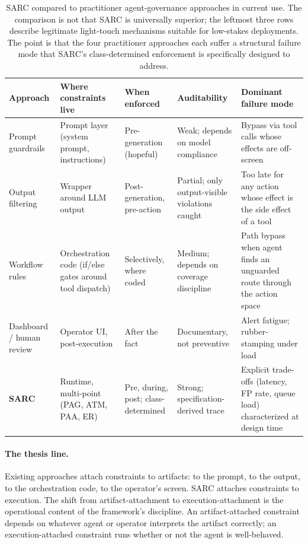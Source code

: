 \documentclass[11pt,a4paper]{article}
\theoremstyle{remark}
\begin{document}
\begin{table}[h]
\centering\footnotesize
\begin{tabularx}{\textwidth}{@{}p{2.8cm}p{2.5cm}p{2.2cm}p{1.6cm}X@{}}
\toprule
\textbf{Approach} & \textbf{Where constraints live} & \textbf{When enforced} & \textbf{Auditability} & \textbf{Dominant failure mode} \\
\midrule
Prompt guardrails & Prompt layer (system prompt, instructions) & Pre-generation (hopeful) & Weak; depends on model compliance & Bypass via tool calls whose effects are off-screen \\
Output filtering & Wrapper around LLM output & Post-generation, pre-action & Partial; only output-visible violations caught & Too late for any action whose effect is the side effect of a tool \\
Workflow rules & Orchestration code (if/else gates around tool dispatch) & Selectively, where coded & Medium; depends on coverage discipline & Path bypass when agent finds an unguarded route through the action space \\
Dashboard / human review & Operator UI, post-execution & After the fact & Documentary, not preventive & Alert fatigue; rubber-stamping under load \\
\textbf{SARC} & Runtime, multi-point (PAG, ATM, PAA, ER) & Pre, during, post; class-determined & Strong; specification-derived trace & Explicit trade-offs (latency, FP rate, queue load) characterized at design time \\
\bottomrule
\end{tabularx}
\caption{SARC compared to practitioner agent-governance approaches in current use. The comparison is not that SARC is universally superior; the leftmost three rows describe legitimate light-touch mechanisms suitable for low-stakes deployments. The point is that the four practitioner approaches each suffer a structural failure mode that SARC's class-determined enforcement is specifically designed to address.}
\label{tab:practitioner-compare}
\end{table}

\paragraph{The thesis line.} Existing approaches attach constraints to artifacts: to the prompt, to the output, to the orchestration code, to the operator's screen. SARC attaches constraints to execution. The shift from artifact-attachment to execution-attachment is the operational content of the framework's discipline. An artifact-attached constraint depends on whatever agent or operator interprets the artifact correctly; an execution-attached constraint runs whether or not the agent is well-behaved.
\end{document}
